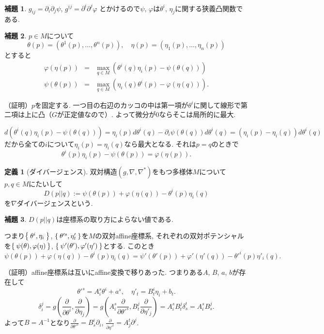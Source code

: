 \documentclass{jsarticle}
\newcommand{\con}{\nabla}
\newcommand{\dcon}{\con^{*}}
\newcommand{\marud}[1]{\partial_{#1}}
\newcommand{\marudd}[1]{\frac{\partial}{\partial #1}}
\theoremstyle{definition}
\newtheorem{lemma}{補題}
\newtheorem{definition}[theorem]{定義}
\numberwithin{theorem}{section}
\begin{document}
\begin{lemma}
$g_{ij}=\partial_i \partial_j \psi$, $g^{ij}=\partial^i \partial^j \varphi$
とかけるので$\psi$, $\varphi$は$\theta^i$, $\eta_j$に関する狭義凸関数である.
\end{lemma}

\begin{lemma}
$p \in M$について
\[
\theta(p)=(\theta^1(p), \dots, \theta^n(p)), \quad \eta(p)=(\eta_1(p), \dots, \eta_n(p))
\]
とすると
\begin{eqnarray*}
\varphi(\eta(p))&=&\max_{q\in M}(\theta^i(q) \eta_i(p)-\psi(\theta(q)))\\
\psi(\theta(p))&=&\max_{q\in M}(\eta_i(q)\theta^i(p)-\varphi(\eta(q))).
\end{eqnarray*}
\end{lemma}

（証明）$p$を固定する. 一つ目の右辺のカッコの中は第一項が$\theta^i$に関して線形で第二項は上に凸（$G$が正定値なので）.
よって微分が0ならそこは局所的に最大.

\[
d(\theta^i(q) \eta_i(p)-\psi(\theta(q)))=\eta_i(p) d \theta^i(q) - \partial_i \psi(\theta(q))d\theta^i(q)=(\eta_i(p)-\eta_i(q))d\theta^i(q)
\]
だから全ての$i$について$\eta_i(p)=\eta_i(q)$なら最大となる. それは$p=q$のときで
\[
\theta^i(p) \eta_i(p)-\psi(\theta(p))=\varphi(\eta(p)).
\]

\begin{definition}[ダイバージェンス]
双対構造$(g,\con,\dcon)$をもつ多様体$M$について$p, q \in M$にたいして
\[
D(p||q):=\psi(\theta(p))+\varphi(\eta(q))-\theta^i(p)\eta_i(q)
\]
を$\con$ダイバージェンスという.
\end{definition}

\begin{lemma}
$D(p||q)$は座標系の取り方によらない値である.

つまり$\Set{\theta^i,\eta_i}$, $\Set{\theta'^s, \eta'_t}$を$M$の双対affine座標系,
それぞれの双対ポテンシャルを$\Set{\psi(\theta),\varphi(\eta)}$, $\Set{\psi'(\theta'),\varphi'(\eta')}$とする.
このとき
\[
\psi(\theta(p))+\varphi(\eta(q))-\theta^i(p)\eta_i(q)=\psi'(\theta'(p))+\varphi'(\eta'(q))-\theta'^i(p)\eta'_i(q).
\]
\end{lemma}

（証明）affine座標系は互いにaffine変換で移りあった. つまりある$A$, $B$, $a$, $b$が存在して
\[
\theta'^s=A_i^s \theta^i+a^s, \quad \eta'_t=B^i_t \eta_i + b_t.
\]
\[
\delta_i^j=g(\marudd{\theta^i},\marudd{\eta_j})=g(A^s_i \marudd{\theta'^s},B^j_t\marudd{\eta'_j})=A^s_i B^j_t \delta^t_s=A^s_i B^j_s.
\]
よって$B=A^{-1}$となり$\marudd{\theta'^s}=B^i_s \marud{i}$, $\marudd{\eta'^t}=A^t_j \partial^j$.
\end{document}
